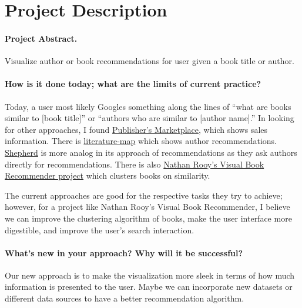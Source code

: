 \section{Project Description}

\paragraph{Project Abstract.}Visualize author or book recommendations for user given a book title or author.
 
\paragraph{How is it done today; what are the limits of current practice?}Today, a user most likely Googles something along the lines of “what are books similar to [book title]” or “authors who are similar to [author name].” In looking for other approaches, I found \href{https://www.publishersmarketplace.com/bookscan/about.cgi}{Publisher’s Marketplace}, which shows sales information. There is \href{https://www.publishersmarketplace.com/bookscan/about.cgi}{literature-map} which shows author recommendations. \href{https://www.publishersmarketplace.com/bookscan/about.cgi}{Shepherd} is more analog in its approach of recommendations as they ask authors directly for recommendations. There is also \href{https://www.publishersmarketplace.com/bookscan/about.cgi}{Nathan Rooy’s Visual Book Recommender project} which clusters books on similarity.

The current approaches are good for the respective tasks they try to achieve; however, for a project like Nathan Rooy’s Visual Book Recommender, I believe we can improve the clustering algorithm of books, make the user interface more digestible, and improve the user’s search interaction.
 
\paragraph{What's new in your approach? Why will it be successful?} Our new approach is to make the visualization more sleek in terms of how much information is presented to the user. Maybe we can incorporate new datasets or different data sources to have a better recommendation algorithm.
 
